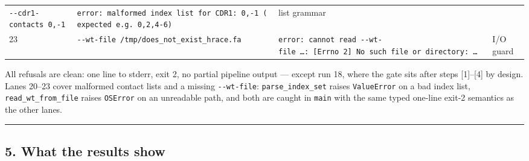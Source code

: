 \begin{longtable}[]{@{}llll@{}}
\begin{minipage}[t]{0.22\columnwidth}
\texttt{-\/-cdr1-contacts\ 0,-1}\strut
\end{minipage} & \begin{minipage}[t]{0.22\columnwidth}\raggedright
\texttt{error:\ malformed\ index\ list\ for\ CDR1:\ \textquotesingle{}0,-1\textquotesingle{}\ (expected\ e.g.\ 0,2,4-6)}\strut
\end{minipage} & \begin{minipage}[t]{0.22\columnwidth}\raggedright
list grammar\strut
\end{minipage}\tabularnewline
\begin{minipage}[t]{0.22\columnwidth}\raggedright
23\strut
\end{minipage} & \begin{minipage}[t]{0.22\columnwidth}\raggedright
\texttt{-\/-wt-file\ /tmp/does\_not\_exist\_hrace.fa}\strut
\end{minipage} & \begin{minipage}[t]{0.22\columnwidth}\raggedright
\texttt{error:\ cannot\ read\ -\/-wt-file\ \ldots{}:\ {[}Errno\ 2{]}\ No\ such\ file\ or\ directory:\ \ldots{}}\strut
\end{minipage} & \begin{minipage}[t]{0.22\columnwidth}\raggedright
I/O guard\strut
\end{minipage}\tabularnewline
\bottomrule
\end{longtable}

All refusals are clean: one line to stderr, exit 2, no partial pipeline
output --- except run 18, where the gate sits after steps
{[}1{]}--{[}4{]} by design. Lanes 20--23 cover malformed contact lists
and a missing \texttt{-\/-wt-file}: \texttt{parse\_index\_set} raises
\texttt{ValueError} on a bad index list, \texttt{read\_wt\_from\_file}
raises \texttt{OSError} on an unreadable path, and both are caught in
\texttt{main} with the same typed one-line exit-2 semantics as the other
lanes.

\begin{center}\rule{0.5\linewidth}{0.5pt}\end{center}

\hypertarget{what-the-results-show}{%
\subsection{5. What the results show}\label{what-the-results-show}}

